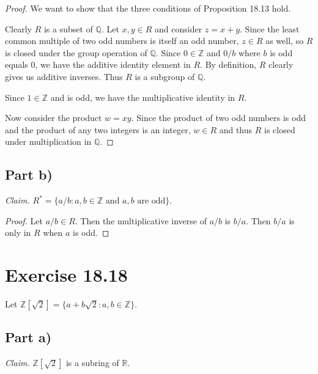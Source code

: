 \documentclass{abrice}
\newcommand{\Z}{\mathbb{Z}}
\newcommand{\R}{\mathbb{R}}
\newcommand{\Q}{\mathbb{Q}}
\begin{document}
\begin{proof}
  We want to show that the three conditions of Proposition 18.13 hold.

  Clearly $R$ is a subset of $\Q$. Let $x,y \in R$ and consider $z = x + y$.
  Since the least common multiple of two odd numbers is itself an odd number, $z
  \in R$ as well, so $R$ is closed under the group operation of $\Q$. Since $0
  \in \Z$ and $0/b$ where $b$ is odd equals $0$, we have the additive identity
  element in $R$. By definition, $R$ clearly gives us additive inverses. Thus
  $R$ is a subgroup of $\Q$.

  Since $1 \in \Z$ and is odd, we have the multiplicative identity in $R$.

  Now consider the product $w = xy$. Since the product of two odd numbers is odd
  and the product of any two integers is an integer, $w \in R$ and thus $R$ is
  closed under multiplication in $\Q$.
\end{proof}

\subsection{Part b)}

\emph{Claim.} $R^* = \{ a/b : a,b \in \Z \text{ and } a,b \text{ are odd} \}$.

\begin{proof}
  Let $a/b \in R$. Then the multiplicative inverse of $a/b$ is $b/a$. Then $b/a$
  is only in $R$ when $a$ is odd.
\end{proof}

\section{Exercise 18.18}

Let $\Z[\sqrt 2] = \{a + b\sqrt 2 : a,b \in \Z \}$.

\subsection{Part a)}

\emph{Claim.} $\Z[\sqrt 2]$ is a subring of $\R$.
\end{document}
